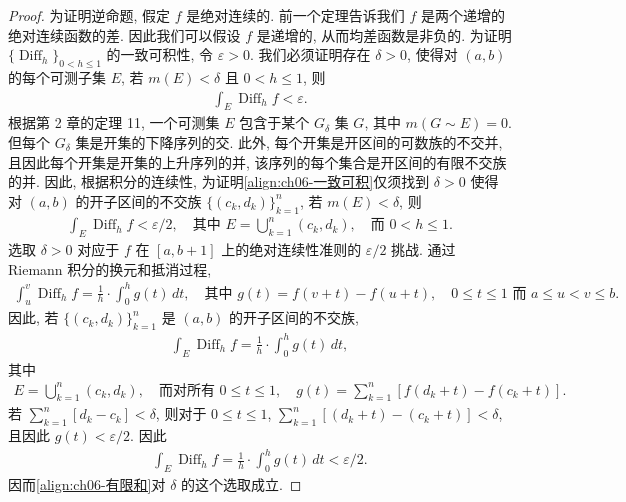 \documentclass[../../main.tex]{subfiles}
\begin{document}
\begin{proof}
为证明逆命题, 假定 $f$ 是绝对连续的. 前一个定理告诉我们 $f$ 是两个递增的绝对连续函数的差. 因此我们可以假设 $f$ 是递增的, 从而均差函数是非负的. 为证明 $\{\operatorname{Diff}_{h}\}_{0<h\leqslant 1}$ 的一致可积性, 令 $\varepsilon>0$. 我们必须证明存在 $\delta>0$, 使得对 $(a,b)$ 的每个可测子集 $E$, 若 $m(E)<\delta$ 且 $0<h\leqslant 1$, 则
\begin{align}
\int_{E}\operatorname{Diff}_{h}f<\varepsilon.\label{align:ch06-一致可积}
\end{align}
根据第 2 章的定理 11, 一个可测集 $E$ 包含于某个 $G_{\delta}$ 集 $G$, 其中 $m(G\sim E)=0$. 但每个 $G_{\delta}$ 集是开集的下降序列的交. 此外, 每个开集是开区间的可数族的不交并, 且因此每个开集是开集的上升序列的并, 该序列的每个集合是开区间的有限不交族的并. 因此, 根据积分的连续性, 为证明\eqref{align:ch06-一致可积}仅须找到 $\delta>0$ 使得对 $(a,b)$ 的开子区间的不交族 $\{(c_{k},d_{k})\}_{k=1}^{n}$, 若 $m(E)<\delta$, 则
\begin{align}
\int_{E}\operatorname{Diff}_{h}f<\varepsilon/2,\quad\text{其中 }E=\bigcup_{k=1}^{n}(c_{k},d_{k}),\quad\text{而 }0<h\leqslant 1.\label{align:ch06-有限和}
\end{align}
选取 $\delta>0$ 对应于 $f$ 在 $[a,b+1]$ 上的绝对连续性准则的 $\varepsilon/2$ 挑战. 通过 Riemann 积分的换元和抵消过程,
\begin{align*}
\int_{u}^{v}\operatorname{Diff}_{h}f=\frac{1}{h}\cdot\int_{0}^{h}g(t)\,dt,\quad\text{其中 }g(t)=f(v+t)-f(u+t),\quad 0\leqslant t\leqslant 1\text{ 而 }a\leqslant u<v\leqslant b.
\end{align*}
因此, 若 $\{(c_{k},d_{k})\}_{k=1}^{n}$ 是 $(a,b)$ 的开子区间的不交族,
\begin{align*}
\int_{E}\operatorname{Diff}_{h}f=\frac{1}{h}\cdot\int_{0}^{h}g(t)\,dt,
\end{align*}
其中
\begin{align*}
E=\bigcup_{k=1}^{n}(c_{k},d_{k}),\quad\text{而对所有 }0\leqslant t\leqslant 1,\quad g(t)=\sum_{k=1}^{n}[f(d_{k}+t)-f(c_{k}+t)].
\end{align*}
若 $\sum_{k=1}^{n}[d_{k}-c_{k}]<\delta$, 则对于 $0\leqslant t\leqslant 1$, $\sum_{k=1}^{n}[(d_{k}+t)-(c_{k}+t)]<\delta$, 且因此 $g(t)<\varepsilon/2$. 因此
\begin{align*}
\int_{E}\operatorname{Diff}_{h}f=\frac{1}{h}\cdot\int_{0}^{h}g(t)\,dt<\varepsilon/2.
\end{align*}
因而\eqref{align:ch06-有限和}对 $\delta$ 的这个选取成立.
\end{proof}
\end{document}
